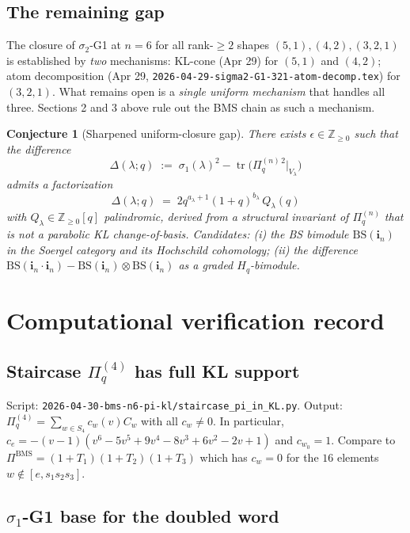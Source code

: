 \documentclass{article}
\newtheorem{conjecture}[theorem]{Conjecture}
\theoremstyle{definition}
\begin{document}
\subsection{The remaining gap}

The closure of $\sigma_2$-G1 at $n=6$ for all rank-$\geq 2$ shapes
$(5,1), (4,2), (3,2,1)$ is established by \emph{two} mechanisms:
KL-cone (Apr 29) for $(5,1)$ and $(4,2)$; atom decomposition (Apr 29,
\texttt{2026-04-29-sigma2-G1-321-atom-decomp.tex}) for $(3,2,1)$.
What remains open is a \emph{single uniform mechanism} that handles
all three. Sections 2 and 3 above rule out the BMS chain as such a
mechanism.

\begin{conjecture}[Sharpened uniform-closure gap]\label{conj:gap}
There exists $\epsilon \in \mathbb{Z}_{\geq 0}$ such that the
difference
\[
\Delta(\lambda; q) \;:=\; \sigma_1(\lambda)^2 - \operatorname{tr}\bigl(\Pi_q^{(n)\, 2}|_{V_\lambda}\bigr)
\]
admits a factorization
\[
\Delta(\lambda; q) \;=\; 2 q^{a_\lambda + 1}(1+q)^{b_\lambda}\,
Q_\lambda(q)
\]
with $Q_\lambda \in \mathbb{Z}_{\geq 0}[q]$ palindromic, derived from
a structural invariant of $\Pi_q^{(n)}$ that is \emph{not} a parabolic
KL change-of-basis. Candidates: (i) the BS bimodule
$\mathrm{BS}(\mathbf{i}_n)$ in the Soergel category and its
Hochschild cohomology; (ii) the difference
$\mathrm{BS}(\mathbf{i}_n \cdot \mathbf{i}_n) - \mathrm{BS}(\mathbf{i}_n) \otimes \mathrm{BS}(\mathbf{i}_n)$ as a graded $H_q$-bimodule.
\end{conjecture}

\section{Computational verification record}

\subsection{Staircase $\Pi_q^{(4)}$ has full KL support}

Script: \texttt{2026-04-30-bms-n6-pi-kl/staircase\_pi\_in\_KL.py}. Output:
$\Pi_q^{(4)} = \sum_{w \in S_4} c_w(v) C_w$ with all $c_w \neq 0$. In
particular, $c_e = -(v-1)(v^6 - 5v^5 + 9v^4 - 8v^3 + 6v^2 - 2v + 1)$
and $c_{w_0} = 1$. Compare to $\Pi^{\text{BMS}} = (1+T_1)(1+T_2)(1+T_3)$
which has $c_w = 0$ for the $16$ elements $w \notin [e, s_1 s_2 s_3]$.

\subsection{$\sigma_1$-G1 base for the doubled word}
\end{document}
